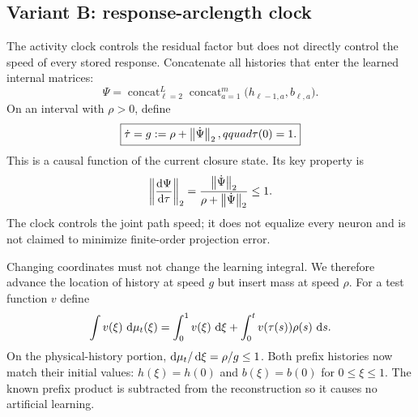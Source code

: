\subsection{Variant B: response-arclength clock}
\label{sec:new-clock}

The activity clock controls the residual factor but does not directly control
the speed of every stored response.  Concatenate all histories that enter the
learned internal matrices:
\begin{equation}
 \Psi=\operatorname{concat}_{\ell=2}^L
       \operatorname{concat}_{a=1}^m
       \bigl(h_{\ell-1,a},b_{\ell,a}\bigr).
 \label{eq:Psi}
\end{equation}
On an interval with $\rho>0$, define
\begin{equation}
 \boxed{\dot\tau=g:=\rho+\left\lVert \dot\Psi\right\rVert_2,qquad \tau(0)=1.}
 \label{eq:response-clock}
\end{equation}
This is a causal function of the current closure state.  Its key property is
\begin{equation}
 \left\lVert\frac{\mathop{}\!\mathrm d\Psi}{\mathop{}\!\mathrm d\tau}\right\rVert_2
 =\frac{\left\lVert \dot\Psi\right\rVert_2}{\rho+\left\lVert \dot\Psi\right\rVert_2}\le1.
 \label{eq:unit-speed}
\end{equation}
The clock controls the joint path speed; it does not equalize every neuron and
is not claimed to minimize finite-order projection error.

Changing coordinates must not change the learning integral.  We therefore
advance the location of history at speed $g$ but insert mass at speed $\rho$.
For a test function $v$ define
\begin{equation}
 \int v(\xi)\,\mathop{}\!\mathrm d\mu_t(\xi)
 =\int_0^1v(\xi)\,\mathop{}\!\mathrm d\xi
  +\int_0^t v(\tau(s))\rho(s)\,\mathop{}\!\mathrm d s .
 \label{eq:weighted-measure}
\end{equation}
On the physical-history portion, $\mathop{}\!\mathrm d\mu_t/\mathop{}\!\mathrm d\xi=\rho/g\le1$.
Both prefix histories now match their initial values:
$h(\xi)=h(0)$ and $b(\xi)=b(0)$ for $0\le\xi\le1$.  The known prefix product
is subtracted from the reconstruction so it causes no artificial learning.

